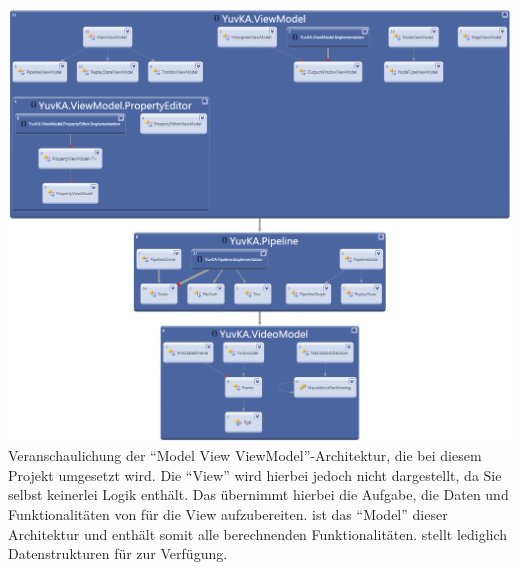 \includegraphics[width=\textwidth]{Diagrams/namespacedependencies.png}
Veranschaulichung der ``Model View ViewModel''-Architektur, die bei diesem Projekt umgesetzt wird. Die ``View'' wird hierbei jedoch nicht dargestellt, da Sie selbst keinerlei Logik enthält. Das  übernimmt hierbei die Aufgabe, die Daten und Funktionalitäten von  für die View aufzubereiten.  ist das ``Model'' dieser Architektur und enthält somit alle berechnenden Funktionalitäten.  stellt lediglich Datenstrukturen für  zur Verfügung.
